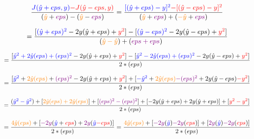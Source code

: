 \documentclass{article}
\begin{document}
\begin{displaymath}
\frac{\textcolor{blue}{J(\hat{y}+eps, y)}
\textcolor{red}{-J(\hat{y}-eps, y)}}
{(\textcolor{orange}{\hat{y}}+\textcolor{violet}{eps})-(
\textcolor{orange}{\hat{y}}-\textcolor{violet}{eps})}
=\frac{\textcolor{blue}{[(\hat{y}+eps)-y]^2}
\textcolor{red}{-[(\hat{y}-eps)-y]^2}}
{(\textcolor{orange}{\hat{y}}+\textcolor{violet}{eps})+(
\textcolor{orange}{-\hat{y}}+\textcolor{violet}{eps})}
\end{displaymath}

\begin{displaymath}
=\frac{[\textcolor{blue}{(\hat{y}+eps)^2}-2y(\hat{y}+eps)+
\textcolor{red}{y^2}]-[\textcolor{blue}{(\hat{y}-eps)^2}
-2y(\hat{y}-eps)+\textcolor{red}{y^2}]}
{(\textcolor{orange}{\hat{y}-\hat{y}})+(\textcolor{violet}{eps+eps})}
\end{displaymath}

\begin{displaymath}
=\frac{[\textcolor{blue}{\hat{y}^2+2\hat{y}(eps)+(eps)^2}
-2y(\hat{y}+eps)+\textcolor{red}{y^2}]-
[\textcolor{blue}{\hat{y}^2-2\hat{y}(eps)+(eps)^2}
-2y(\hat{y}-eps)+\textcolor{red}{y^2}]}
{2*(eps)}
\end{displaymath}

\begin{displaymath}
=\frac{[\textcolor{blue}{\hat{y}^2}+\textcolor{orange}{2\hat{y}(eps)}
+\textcolor{violet}{(eps)^2}-2y(\hat{y}+eps)+\textcolor{red}{y^2}]+
[\textcolor{blue}{-\hat{y}^2}+\textcolor{orange}{2\hat{y}(eps)}
\textcolor{violet}{-(eps)^2}+2y(\hat{y}-eps)\textcolor{red}{-y^2}]}
{2*(eps)}
\end{displaymath}

\begin{displaymath}
=\frac{(\textcolor{blue}{\hat{y}^2-\hat{y}^2})+[
\textcolor{orange}{2\hat{y}(eps)+2\hat{y}(eps)}]+[
\textcolor{violet}{(eps)^2-(eps)^2}]+[
-2y(\hat{y}+eps)+2y(\hat{y}+eps)]+[\textcolor{red}{y^2-y^2}]}
{2*(eps)}
\end{displaymath}

\begin{displaymath}
=\frac{\textcolor{orange}{4\hat{y}(eps)}+[\textcolor{violet}{-2y}
(\textcolor{blue}{\hat{y}}+\textcolor{red}{eps})+\textcolor{violet}
{2y}(\textcolor{blue}{\hat{y}}\textcolor{red}{-eps})]}
{2*(eps)}
=\frac{\textcolor{orange}{4\hat{y}(eps)}+[\textcolor{violet}{-2y}
(\textcolor{blue}{\hat{y}})\textcolor{violet}{-2y}
(\textcolor{red}{eps})]+[\textcolor{violet}{2y}
(\textcolor{blue}{\hat{y}})\textcolor{violet}{-2y}
(\textcolor{red}{eps})]}{2*(eps)}
\end{displaymath}
\end{document}
